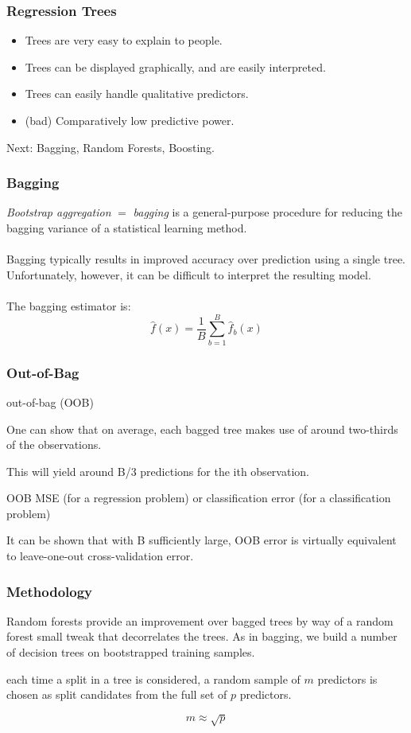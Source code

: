\documentclass{beamer}
\begin{document}
\begin{frame}
\frametitle{Regression Trees}

\begin{itemize}
\item Trees are very easy to explain to people.
\item Trees can be displayed graphically, and are easily interpreted.
\item Trees can easily handle qualitative predictors.
\item (bad) Comparatively low predictive power.
\end{itemize}
Next: Bagging, Random Forests, Boosting. 
\end{frame} 



\begin{frame}
\frametitle{Bagging}


\textit{Bootstrap aggregation} $=$ \textit{bagging}  is a general-purpose procedure for reducing the bagging variance of a statistical learning method.
\\~\\
Bagging typically results in improved accuracy over prediction using a single tree. Unfortunately, however, it can be difficult to interpret the resulting model.
\\~\\
The bagging estimator is:
$$ \hat{f}(x) = \frac{1}{B} \sum\limits_{b=1}^{B} \hat{f}_b(x)  $$

\end{frame} 



\begin{frame}
\frametitle{Out-of-Bag}

out-of-bag (OOB) 

One can show that on average, each bagged tree makes use of around two-thirds of the observations. 

This will yield around B/3 predictions for the ith observation. 

OOB MSE (for a regression problem) or classification error (for a
classification problem) 

It can be shown that with B sufficiently large, OOB error is virtually equivalent to leave-one-out cross-validation error.


\end{frame} 


\begin{frame}
\frametitle{Methodology}


Random forests provide an improvement over bagged trees by way of a
random
forest small tweak that decorrelates the trees. As in bagging, we build a number
of decision trees on bootstrapped training samples.

each time a split in a tree is considered, a random sample of $m$ predictors is chosen as split candidates from the full set of $p$ predictors.

$$ m  \approx \sqrt{p} $$

\end{frame} 
\end{document}
